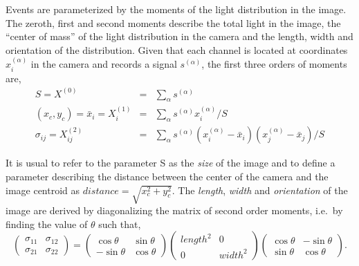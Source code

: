 Events are parameterized by the moments of the light distribution in
the image. The zeroth, first and second moments describe the total
light in the image, the ``center of mass'' of the light distribution
in the camera and the length, width and orientation of the
distribution.  Given that each channel is located at coordinates
$x^{(\alpha)}_i$ in the camera and records a signal $s^{(\alpha)}$,
the first three orders of moments are,
\begin{eqnarray*}
S = X^{(0)} & = & \sum_\alpha s^{(\alpha)} \\
(x_c, y_c) = \bar{x}_i = X^{(1)}_i & = & \sum_\alpha s^{(\alpha)}x^{(\alpha)}_i / S \\
\sigma_{ij} = X^{(2)}_{ij} & = & \sum_\alpha 
s^{(\alpha)}(x^{(\alpha)}_i-\bar{x}_i)(x^{(\alpha)}_j-\bar{x}_j)/S
\end{eqnarray*}

It is usual to refer to the parameter S as the \textit{size} of the
image and to define a parameter describing the distance between the
center of the camera and the image centroid as
$distance=\sqrt{x_c^2+y_c^2}$. The \textit{length},
\textit{width} and \textit{orientation} of the image are derived by 
diagonalizing the matrix of second order moments, i.e.\ by finding 
the value of $\theta$ such that,
\[\left(\begin{array}{cc} \sigma_{11} & \sigma_{12} \\ 
\sigma_{21} & \sigma_{22} \end{array} \right) =
\left(\begin{array}{cc} \cos\theta & \sin\theta \\ 
-\sin\theta & \cos\theta \end{array} \right) 
\left(\begin{array}{cc} length^2 & 0 \\ 
0 & width^2 \end{array} \right) 
\left(\begin{array}{cc} \cos\theta & -\sin\theta \\ 
\sin\theta & \cos\theta \end{array} \right).\]

